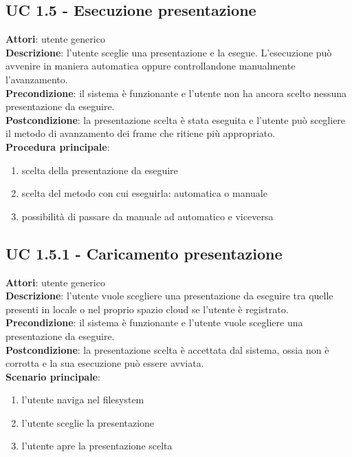 \subsection{UC 1.5 - Esecuzione presentazione}{
	\label{uc1.5}
	\textbf{Attori}: utente generico \\
	\textbf{Descrizione}: l'utente sceglie una presentazione e la esegue. L'esecuzione può avvenire in maniera automatica oppure controllandone manualmente l'avanzamento. \\
	\textbf{Precondizione}: il sistema è funzionante e l'utente non ha ancora scelto nessuna presentazione da eseguire.	\\
	\textbf{Postcondizione}: la presentazione scelta è stata eseguita e l'utente può scegliere il metodo di avanzamento dei frame che ritiene più appropriato.	\\
	\textbf{Procedura principale}:
	\begin{enumerate}
		\item scelta della presentazione da eseguire
		\item scelta del metodo con cui eseguirla: automatica o manuale
		\item possibilità di passare da manuale ad automatico e viceversa
	\end{enumerate}
	}
\subsection{UC 1.5.1 - Caricamento presentazione}{
	\label{uc1.5.1}
	\textbf{Attori}: utente generico \\
	\textbf{Descrizione}: l'utente vuole scegliere una presentazione da eseguire tra quelle presenti in locale o nel proprio spazio cloud se l'utente è registrato. \\
	\textbf{Precondizione}: il sistema è funzionante e l'utente vuole scegliere una presentazione da eseguire.	\\
	\textbf{Postcondizione}: la presentazione scelta è accettata dal sistema, ossia non è corrotta e la sua esecuzione può essere avviata.	\\
	\textbf{Scenario principale}:
	\begin{enumerate}
		\item l'utente naviga nel filesystem
		\item l'utente sceglie la presentazione
		\item l'utente apre la presentazione scelta
	\end{enumerate}
	}

